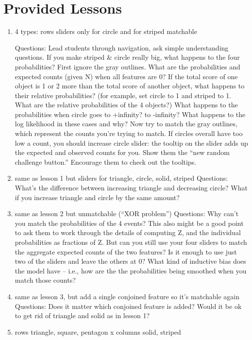\documentclass[11pt,letterpaper]{article}
\begin{document}
 \section{Provided Lessons}
\begin{enumerate}
\item 
4 types: rows %
sliders only for circle and for striped
matchable

Questions: Lead students through navigation, ask simple understanding questions. If you make striped \& circle really big, what happens to the four probabilities?  First ignore the gray outlines.  What are the probabilities and expected counts (given N) when all features are 0?  If the total score of one object is 1 or 2 more than the total score of another object, what happens to their relative probabilities?  (for example, set circle to 1 and striped to 1.  What are the relative probabilities of the 4 objects?)  What happens to the probabilities when circle goes to +infinity?  to -infinity?  What happens to the log likelihood in these cases and why?  Now try to match the gray outlines, which represent the counts you’re trying to match.  If circles overall have too low a count, you should increase circle slider: the tooltip on the slider adds up the expected and observed counts for you.  Show them the “new random challenge button.”  Encourage them to check out the tooltips.
\item same as lesson 1 but sliders for triangle, circle, solid, striped
Questions: What’s the difference between increasing triangle and decreasing circle?  What if you increase triangle and circle by the same amount?  
\item same as lesson 2 but unmatchable (“XOR problem”)
Questions: Why can’t you match the probabilities of the 4 events? This also might be a good point to ask them to work through the details of computing Z, and the individual probabilities as fractions of Z. But can you still use your four sliders to match the aggregate expected counts of the two features?  Is it enough to use just two of the sliders and leave the others at 0?  What kind of inductive bias does the model have -- i.e., how are the the probabilities being smoothed when you match those counts?    
\item same as lesson 3, but add a single conjoined feature so it’s matchable again Questions: Does it matter which conjoined feature is added?  Would it be ok to get rid of triangle and solid as in lesson 1?
\item rows {triangle, square, pentagon} x columns {solid, striped}

\end{enumerate}
\end{document}
